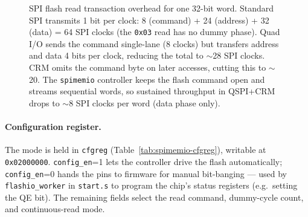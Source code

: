 \documentclass[9pt, a4paper]{extarticle}
\begin{document}
\begin{figure}[htbp]
    \caption{SPI flash read transaction overhead for one 32-bit word. Standard SPI transmits 1 bit per clock: 8 (command) + 24 (address) + 32 (data) = 64 SPI clocks (the \texttt{0x03} read has no dummy phase). Quad I/O sends the command single-lane (8 clocks) but transfers address and data 4 bits per clock, reducing the total to $\sim$28 SPI clocks. CRM omits the command byte on later accesses, cutting this to $\sim$20. The \texttt{spimemio} controller keeps the flash command open and streams sequential words, so sustained throughput in QSPI+CRM drops to $\sim$8 SPI clocks per word (data phase only).}
    \label{fig:spi-timing}
\end{figure}

\pagebreak
\paragraph{Configuration register.} The mode is held in \texttt{cfgreg} (Table~\ref{tab:spimemio-cfgreg}), writable at \texttt{0x02000000}. \texttt{config\_en}=1 lets the controller drive the flash automatically; \texttt{config\_en}=0 hands the pins to firmware for manual bit-banging --- used by \texttt{flashio\_worker} in \texttt{start.s} to program the chip's status registers (e.g.\ setting the QE bit). The remaining fields select the read command, dummy-cycle count, and continuous-read mode.
\end{document}

